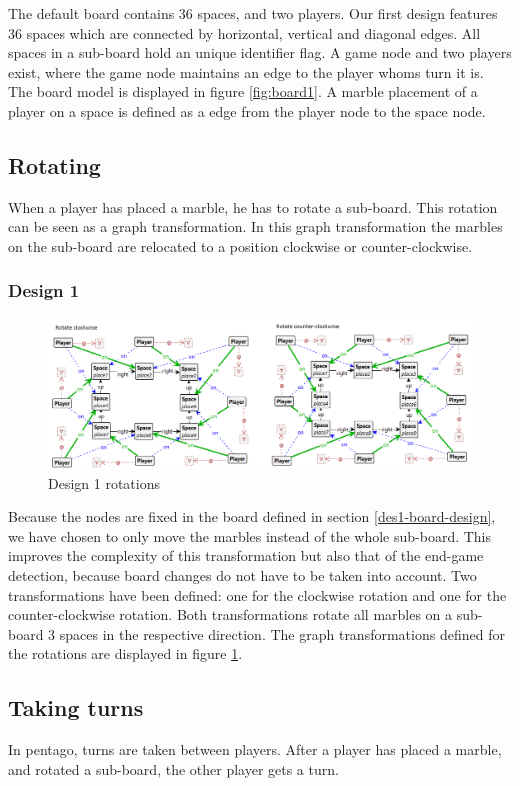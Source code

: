 The default board contains 36 spaces, and two players.
Our first design features 36 spaces which are connected by horizontal, vertical and diagonal edges.
All spaces in a sub-board hold an unique identifier flag.
A game node and two players exist, where the game node maintains an edge to the player whoms turn it is.
The board model is displayed in figure \ref{fig:board1}.
A marble placement of a player on a space is defined as a edge from the player node to the space node.

\subsection{Rotating}
When a player has placed a marble, he has to rotate a sub-board.
This rotation can be seen as a graph transformation.
In this graph transformation the marbles on the sub-board are relocated to a position clockwise or counter-clockwise.

\subsubsection{Design 1}
\begin{figure}[!h]
    \centering
    \includegraphics[scale=0.5,clip]{Images/rotate1.png}
    \caption{Design 1 rotations}
    \label{fig:rotate1}
\end{figure}

Because the nodes are fixed in the board defined in section \ref{des1-board-design}, we have chosen to only move the marbles instead of the whole sub-board.
This improves the complexity of this transformation but also that of the end-game detection, because board changes do not have to be taken into account.
Two transformations have been defined: one for the clockwise rotation and one for the counter-clockwise rotation.
Both transformations rotate all marbles on a sub-board 3 spaces in the respective direction.
The graph transformations defined for the rotations are displayed in figure \ref{fig:rotate1}.

\subsection{Taking turns}
In pentago, turns are taken between players. 
After a player has placed a marble, and rotated a sub-board, the other player gets a turn.
